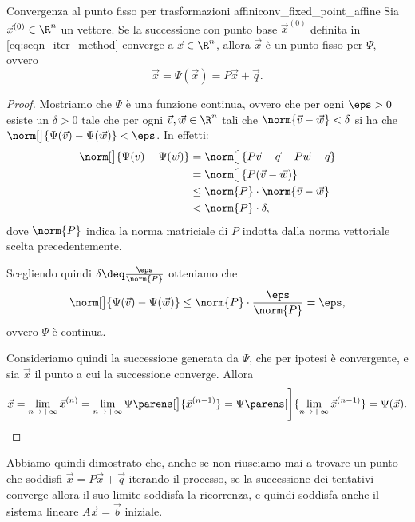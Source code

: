 \begin{theorem}
    {Convergenza al punto fisso per trasformazioni affini}{conv_fixed_point_affine}
    Sia $\vec x^{(0)} \in \R^n$ un vettore. Se la successione con punto base $\vec x^{(0)}$ definita in \eqref{eq:seqn_iter_method} converge a $\vec x \in \R^n$, allora $\vec x$ è un punto fisso per $\Psi$, ovvero \[
        \vec x = \Psi(\vec x) = P\vec x + \vec q.
    \] 
\end{theorem}
\begin{proof}
    Mostriamo che $\Psi$ è una funzione continua, ovvero che per ogni $\eps > 0$ esiste un $\delta > 0$ tale che per ogni $\vec v, \vec w \in \R^n$ tali che $\norm{\vec v - \vec w} < \delta$ si ha che $\norm[\big]{\Psi(\vec v) - \Psi(\vec w)} < \eps$. In effetti:
    \begin{align*}
        \norm[\big]{\Psi(\vec v) - \Psi(\vec w)}
        &= \norm[\big]{P\vec v - \vec q - P\vec w + \vec q}\\
        &= \norm[\big]{P(\vec v - \vec w)}\\
        &\leq \norm{P} \cdot \norm{\vec v - \vec w}\\
        &< \norm{P} \cdot \delta,
    \end{align*} dove $\norm{P}$ indica la norma matriciale di $P$ indotta dalla norma vettoriale scelta precedentemente.
    
    Scegliendo quindi $\delta \deq \frac{\eps}{\norm{P}}$ otteniamo che \[
        \norm[\big]{\Psi(\vec v) - \Psi(\vec w)} \leq \norm{P} \cdot \frac{\eps}{\norm{P}} = \eps,
    \] ovvero $\Psi$ è continua.

    Consideriamo quindi la successione generata da $\Psi$, che per ipotesi è convergente, e sia $\vec x$ il punto a cui la successione converge. Allora \[
        \vec x 
        = \lim_{n \to +\infty} \vec x^{(n)} 
        = \lim_{n \to +\infty} \Psi\parens[\big]{\vec x^{(n-1)}}
        = \Psi\parens[\Bigg]{\lim_{n \to +\infty} \vec x^{(n-1)}}
        = \Psi(\vec x). \qedhere
    \]
\end{proof}

Abbiamo quindi dimostrato che, anche se non riusciamo mai a trovare un punto che soddisfi $\vec x = P\vec x + \vec q$ iterando il processo, se la successione dei tentativi converge allora il suo limite soddisfa la ricorrenza, e quindi soddisfa anche il sistema lineare $A\vec x = \vec b$ iniziale.

